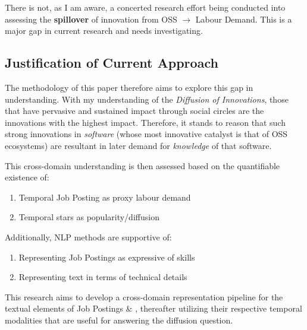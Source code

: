 There is not, as I am aware, a concerted research effort being conducted into assessing the \textbf{spillover} of innovation from OSS $\rightarrow$ Labour Demand.
This is a major gap in current research and needs investigating.

\subsection{Justification of Current Approach}

The methodology of this paper therefore aims to explore this gap in understanding.
With my understanding of the \emph{Diffusion of Innovations}, those that have pervasive and sustained impact through social circles are the innovations with the highest impact.
Therefore, it stands to reason that such strong innovations in \emph{software} (whose most innovative catalyst is that of OSS ecosystems) are resultant in later demand for \emph{knowledge} of that software.

This cross-domain understanding is then assessed based on the quantifiable existence of:
\begin{enumerate}
  \item Temporal Job Posting as proxy labour demand
  \item Temporal \ghrepo{} stars as popularity/diffusion
\end{enumerate}

Additionally, NLP methods are supportive of:
\begin{enumerate}
  \item Representing Job Postings as expressive of skills
  \item Representing \ghrepo{} text in terms of technical details
\end{enumerate}

This research aims to develop a cross-domain representation pipeline for the textual elements of Job Postings \& \ghrepo{}, thereafter utilizing their respective temporal modalities that are useful for answering the diffusion question.

